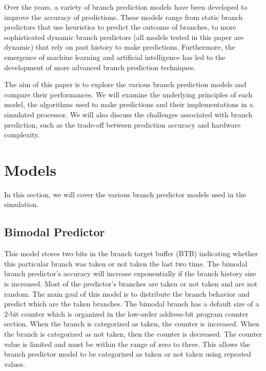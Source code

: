 \documentclass[conference]{IEEEtran}
\begin{document}
Over the years, a variety of branch prediction models have been developed to improve the accuracy of predictions. These models range from static branch predictors that use heuristics to predict the outcome of branches, to more sophisticated dynamic branch predictors (all models tested in this paper are dynamic) that rely on past history to make predictions. Furthermore, the emergence of  machine learning and artificial intelligence has led to the development of more advanced branch prediction techniques.

The aim of this paper is to explore the various branch prediction models and compare their performances. We will examine the underlying principles of each model, the algorithms used to make predictions and their implementations in a simulated processor. We will also discuss the challenges associated with branch prediction, such as the trade-off between prediction accuracy and hardware complexity.

\section{Models}
In this section, we will cover the various branch predictor models used in the simulation.

\subsection{Bimodal Predictor} \label{ssec::bimodal}
This model stores two bits in the branch target buffer (BTB) indicating whether this particular branch was taken or not taken the last two time. The bimodal branch predictor's accuracy will increase exponentially if the branch history size is increased. Most of the predictor's branches are taken or not taken and are not random. The main goal of this model is to distribute the branch behavior and predict which are the taken branches. The bimodal branch has a default size of a 2-bit counter which is organized in the low-order address-bit program counter section. When the branch is categorized as taken, the counter is increased. When the branch is categorized as not taken, then the counter is decreased. The counter value is limited and must be within the range of zero to three. This allows the branch predictor model to be categorized as taken or not taken using repeated values.
\end{document}
